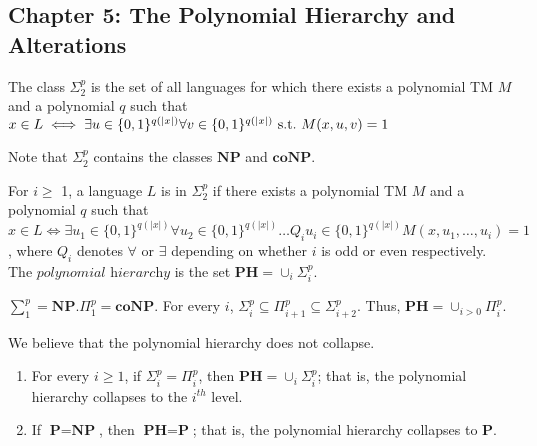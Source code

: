 \subsection*{Chapter 5: The Polynomial Hierarchy and Alterations}
\begin{note}
The class $\Sigma_{2}^{p}$ is the set of all languages for which
there exists a polynomial TM $M$
and a polynomial $q$ such that
$x \in L \iff \exists u \in \{0,1\}^{q(|x|)} \forall v \in
\{0,1\}^{q(|x|)} \mathrm{\ s.t.\ } M(x, u, v) = 1 $

Note that $\Sigma_{2}^{p}$ contains the
classes $\textbf{NP}$ and $\textbf{coNP}$.
\end{note}

\begin{note}
For $ i \geq$ 1, a language $L$ is in $\Sigma_{2}^{p}$ if
there exists a polynomial TM $M$ and a polynomial $q$ such that
$x \in L \iff \exists u_{1} \in \{0,1\}^{q(|x|)}
  \forall u_{2} \in \{0,1\}^{q(|x|)} \ldots
Q_{i}u_{i} \in \{0,1\}^{q(|x|)} M(x, u_{1}, \ldots, u_{i}) = 1 $,
where $Q_i$ denotes $\forall$ or $\exists$ depending on
whether $i$ is odd or even respectively.
The $\textit{polynomial hierarchy}$ is the set $\textbf{PH} = \cup_{i} \Sigma_{i}^{p}$.
\end{note}

\begin{note}
$\sum_{1}^{p} = \textbf{NP}. 
\Pi_{1}^{p} = \textbf{coNP}$. 
For every $i$, $\Sigma_{i}^{p} \subseteq \Pi_{i+1}^{p} \subseteq \Sigma_{i+2}^{p}.$ 
Thus, $\textbf{PH} = \cup_{i > 0} \Pi_{i}^{p}$.
\end{note}

\begin{note}[Collapse]
We believe that the polynomial hierarchy does not collapse.

\begin{enumerate}
	\item
		For every $i \geq 1$, if $\Sigma_{i}^{p} = \Pi_{i}^{p}$, then 
		$\textbf{PH} = \cup_{i} \Sigma_{i}^{p}$; that is, the polynomial hierarchy collapses
		to the $i^{th}$ level.
	\item
		If $\textbf{P} = \textbf{NP}$, then $\textbf{PH} = \textbf{P}$; that is, the polynomial
		hierarchy collapses to $\textbf{P}$.
\end{enumerate}
\end{note}

